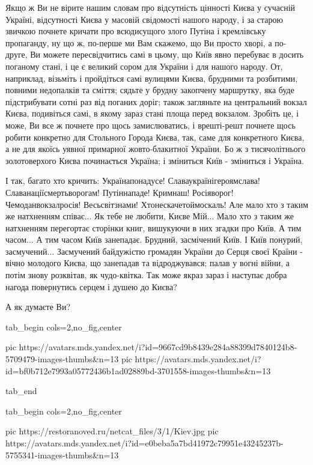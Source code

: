 Якщо ж Ви не вірите нашим словам про відсутність цінності Києва у сучасній
Україні, відсутності Києва у масовій свідомості нашого народу, і за старою
звичкою почнете кричати про всюдисущого злого Путіна і кремлівську пропаганду,
ну що ж, по-перше ми Вам скажемо, що Ви просто хворі, а по-друге, Ви можете
пересвідчитись самі в цьому, що Київ явно перебуває в досить поганому стані, і
це є великий сором для України і для нашого народу. От, наприклад, візьміть і
пройдіться самі вулицями Києва, брудними та розбитими, повними недопалків та
сміття; сядьте у брудну закопчену маршрутку, яка буде підстрибувати сотні раз
від поганих доріг; також загляньте на центральний вокзал Києва, подивіться
самі, в якому зараз стані площа перед вокзалом.  Зробіть це, і може, Ви все ж
почнете про щось замислюватись, і врешті-решт почнете щось робити конкретно для
Стольного Города Києва, так, саме для конкретного Києва, а не для якоїсь уявної
примарної жовто-блакитної України. Бо ж з тисячолітнього золотоверхого Києва
починається Україна; і зміниться Київ - зміниться і Україна.

І так, багато хто кричить: Українапонадусе! Славаукраїнігероямслава!
Славанаціїсмертьворогам! Путіннападе! Кримнаш! Росіяворог!  Чемоданвокзалросія!
Весьсвітзнами! Хтонескачетоймоскаль! Але мало хто з таким же натхненням
співає... Як тебе не любити, Києве Мій... Мало хто з таким же натхненням
перегортає сторінки книг, вишукуючи в них згадки про Київ.  А тим часом... А
тим часом Київ занепадає.  Брудний, засмічений Київ. І Київ понурий,
засмучений... Засмучений байдужістю громадян України до Серця своєї Країни -
вічно молодого Києва, що занепадав та відроджувався; палав у вогні війни, а
потім знову розквітав, як чудо-квітка.  Так може якраз зараз і наступає добра
нагода повернутись серцем і душею до Києва?

А як думаєте Ви?

\ifcmt
  tab_begin cols=2,no_fig,center

		 pic https://avatars.mds.yandex.net/i?id=9667cd9b8439e284a88399d7840124b8-5709479-images-thumbs&n=13
     pic https://avatars.mds.yandex.net/i?id=bf0b712e7993a05772436b1ad02889bd-3701558-images-thumbs&n=13

  tab_end
\fi


\ifcmt
  tab_begin cols=2,no_fig,center

     pic https://restoranoved.ru/netcat_files/3/1/Kiev.jpg
		 pic https://avatars.mds.yandex.net/i?id=e0beba5a7bd41972c79951e43245237b-5755341-images-thumbs&n=13

